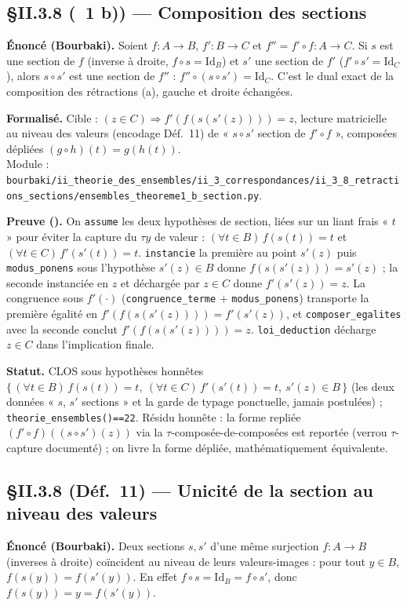 \subsection{§II.3.8 (\theoreme~1 b)) --- Composition des sections}
\textbf{Énoncé (Bourbaki).} Soient $f : A \to B$, $f' : B \to C$ et $f'' = f' \circ f : A \to C$. Si $s$ est une section de $f$ (inverse à droite, $f \circ s = \mathrm{Id}_B$) et $s'$ une section de $f'$ ($f' \circ s' = \mathrm{Id}_C$), alors $s \circ s'$ est une section de $f''$ : $f'' \circ (s \circ s') = \mathrm{Id}_C$. C'est le dual exact de la composition des rétractions (a), gauche et droite échangées.

\textbf{Formalisé.} Cible : $(z \in C) \Rightarrow f'(f(s(s'(z)))) = z$, lecture matricielle au niveau des valeurs (encodage Déf.~11) de « $s \circ s'$ section de $f' \circ f$ », composées dépliées $(g \circ h)(t) = g(h(t))$. \\
Module : \texttt{bourbaki/ii\_theorie\_des\_ensembles/ii\_3\_correspondances/ii\_3\_8\_retractions\_sections/ensembles\_theoreme1\_b\_section.py}.

\textbf{Preuve (\Nstar).} On \texttt{assume} les deux hypothèses de section, liées sur un liant frais « $t$ » pour éviter la capture du $\tau y$ de valeur : $(\forall t\in B)\,f(s(t))=t$ et $(\forall t\in C)\,f'(s'(t))=t$. \texttt{instancie} la première au point $s'(z)$ puis \texttt{modus\_ponens} sous l'hypothèse $s'(z)\in B$ donne $f(s(s'(z)))=s'(z)$ ; la seconde instanciée en $z$ et déchargée par $z\in C$ donne $f'(s'(z))=z$. La congruence sous $f'(\cdot)$ (\texttt{congruence\_terme} + \texttt{modus\_ponens}) transporte la première égalité en $f'(f(s(s'(z))))=f'(s'(z))$, et \texttt{composer\_egalites} avec la seconde conclut $f'(f(s(s'(z))))=z$. \texttt{loi\_deduction} décharge $z\in C$ dans l'implication finale.

\textbf{Statut.} CLOS sous hypothèses honnêtes $\{\,(\forall t\in B)\,f(s(t))=t,\ (\forall t\in C)\,f'(s'(t))=t,\ s'(z)\in B\,\}$ (les deux données « $s$, $s'$ sections » et la garde de typage ponctuelle, jamais postulées) ; \texttt{theorie\_ensembles()==22}. Résidu honnête : la forme repliée $(f'\circ f)((s\circ s')(z))$ via la $\tau$-composée-de-composées est reportée (verrou $\tau$-capture documenté) ; on livre la forme dépliée, mathématiquement équivalente.

\subsection{§II.3.8 (Déf.~11) --- Unicité de la section au niveau des valeurs}
\textbf{Énoncé (Bourbaki).} Deux sections $s, s'$ d'une même surjection $f : A \to B$ (inverses à droite) coïncident au niveau de leurs valeurs-images : pour tout $y \in B$, $f(s(y)) = f(s'(y))$. En effet $f \circ s = \mathrm{Id}_B = f \circ s'$, donc $f(s(y)) = y = f(s'(y))$.

